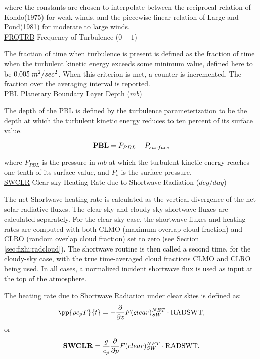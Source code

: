 \noindent
where the constants are chosen to interpolate between the reciprocal relation of
Kondo(1975) for weak winds, and the piecewise linear relation of Large and Pond(1981) 
for moderate to large winds.
\\
 
\noindent
{ \underline {FRQTRB}  Frequency of Turbulence ($0-1$) }

\noindent
The fraction of time when turbulence is present is defined as the fraction of
time when the turbulent kinetic energy exceeds some minimum value, defined here
to be $0.005 \hspace{.1cm}m^2/sec^2$. When this criterion is met, a counter is
incremented. The fraction over the averaging interval is reported.
\\
 
\noindent
{ \underline {PBL}  Planetary Boundary Layer Depth ($mb$) }

\noindent
The depth of the PBL is defined by the turbulence parameterization to be the
depth at which the turbulent kinetic energy reduces to ten percent of its surface
value.

\[
{\bf PBL} = P_{PBL} - P_{surface}
\]

\noindent
where $P_{PBL}$ is the pressure in $mb$ at which the turbulent kinetic energy
reaches one tenth of its surface value, and $P_s$ is the surface pressure.
\\
 
\noindent
{ \underline {SWCLR} Clear sky Heating Rate due to Shortwave Radiation ($deg/day$) }

\noindent
The net Shortwave heating rate is calculated as the vertical divergence of the
net solar radiative fluxes.
The clear-sky and cloudy-sky shortwave fluxes are calculated separately.
For the clear-sky case, the shortwave fluxes and heating rates are computed with
both CLMO (maximum overlap cloud fraction) and
CLRO (random overlap cloud fraction) set to zero (see Section \ref{sec:fizhi:radcloud}).
The shortwave routine is then called a second time, for the cloudy-sky case, with the
true time-averaged cloud fractions CLMO
and CLRO being used.  In all cases, a normalized incident shortwave flux is used as
input at the top of the atmosphere.

\noindent
The heating rate due to Shortwave Radiation under clear skies is defined as:
\[
\pp{\rho c_p T}{t} = - {\partial \over \partial z} F(clear)_{SW}^{NET} \cdot {\rm RADSWT},
\]
or
\[
{\bf SWCLR} = \frac{g}{c_p } {\partial \over \partial p} F(clear)_{SW}^{NET}\cdot {\rm RADSWT} .
\]

